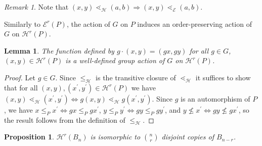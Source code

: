 \documentclass[10 pt]{amsart}
\theoremstyle{plain}
\newtheorem{prop}[thm]{Proposition}
\newtheorem{lem}[thm]{Lemma}
\theoremstyle{definition}
\theoremstyle{remark}
\newtheorem{rem}[thm]{Remark}
\numberwithin{equation}{section}
\renewcommand{\iff}{\Leftrightarrow}
\begin{document}
\begin{rem}\label{rem:order_containment}
Note that $(x, y)\lessdot_{\mathcal{H}} (a, b) \Rightarrow (x, y)\lessdot_{\mathcal E} (a, b)$.
\end{rem}

Similarly to $\mathcal E^r(P)$, the action of $G$ on $P$ induces an order-preserving action of $G$ on $\mathcal{H}^r(P)$.

\begin{lem}
\label{lem:G_action_on_HP}
The function defined by $g\cdot (x, y)= (gx, gy)$ for all $g\in G$, $(x, y)\in \mathcal{H}^r(P)$ is a well-defined group action of $G$ on $\mathcal{H}^r(P)$.
\end{lem}

\begin{proof}
Let $g\in G$.  Since $\le_{\mathcal{H}}$ is the transitive closure of $\lessdot_{\mathcal{H}}$ it suffices to show that for all $(x,y),(x^\prime,y^\prime)\in \mathcal{H}^r(P)$ we have $(x, y) \lessdot_{\mathcal H} (x^\prime,y^\prime) \iff g(x, y) \lessdot_{\mathcal H} g(x^\prime, y^\prime)$.  Since $g$ is an automorphism of $P$, we have $x\le_P x^\prime \iff gx\le_P gx^\prime$, $y\le_P y^\prime \iff gy\le_P gy^\prime$, and $y\not\le x^\prime \iff gy\not\le gx^\prime$, so the result follows from the definition of $\le_{\mathcal{H}}$.



\end{proof}

\begin{prop}\label{prop:computing_HBn}
$\mathcal{H}^r(B_n)$ is isomorphic to $\binom{n}{r}$ disjoint copies of $B_{n-r}$.
\end{prop}
\end{document}

